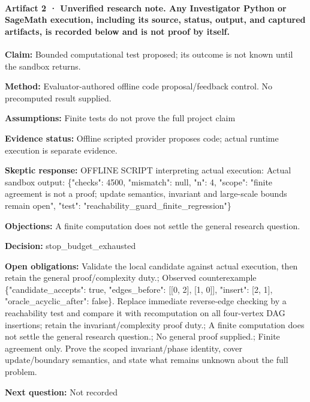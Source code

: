 \documentclass[11pt]{article}
\begin{document}
\paragraph{Artifact 2 · Unverified research note. Any Investigator Python or SageMath execution, including its source, status, output, and captured artifacts, is recorded below and is not proof by itself.}
\textbf{Claim:} Bounded computational test proposed; its outcome is not known until the sandbox returns.\par
\textbf{Method:} Evaluator-authored offline code proposal/feedback control. No precomputed result supplied.\par
\textbf{Assumptions:} Finite tests do not prove the full project claim\par
\textbf{Evidence status:} Offline scripted provider proposes code; actual runtime execution is separate evidence.\par
\textbf{Skeptic response:} OFFLINE SCRIPT interpreting actual execution: Actual sandbox output: \{"checks": 4500, "mismatch": null, "n": 4, "scope": "finite agreement is not a proof; update semantics, invariant and large-scale bounds remain open", "test": "reachability\_guard\_finite\_regression"\}\par
\textbf{Objections:} A finite computation does not settle the general research question.\par
\textbf{Decision:} stop\_budget\_exhausted\par
\textbf{Open obligations:} Validate the local candidate against actual execution, then retain the general proof/complexity duty.; Observed counterexample \{"candidate\_accepts": true, "edges\_before": [[0, 2], [1, 0]], "insert": [2, 1], "oracle\_acyclic\_after": false\}. Replace immediate reverse-edge checking by a reachability test and compare it with recomputation on all four-vertex DAG insertions; retain the invariant/complexity proof duty.; A finite computation does not settle the general research question.; No general proof supplied.; Finite agreement only. Prove the scoped invariant/phase identity, cover update/boundary semantics, and state what remains unknown about the full problem.\par
\textbf{Next question:} Not recorded\par
\end{document}
